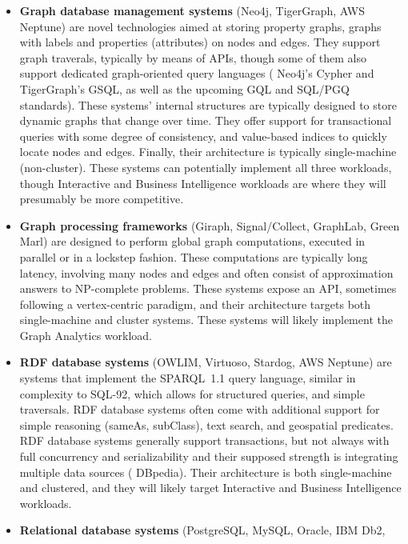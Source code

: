 \begin{itemize}
 \item \textbf{Graph database management systems} (\eg Neo4j, TigerGraph, AWS Neptune)
     are novel technologies aimed at storing property graphs,
     \ie graphs with labels and properties (attributes) on nodes and edges.
     They support graph traverals, typically by means of APIs, though
     some of them also support dedicated graph-oriented query languages (\eg
     Neo4j's Cypher and TigerGraph's GSQL, as well as the upcoming GQL and SQL/PGQ standards).
     These systems' internal structures are typically designed
     to store dynamic graphs that change over time.  They offer support for
     transactional queries with some degree of consistency, and value-based
     indices to quickly locate nodes and edges. Finally, their architecture is
     typically single-machine (non-cluster). These systems can
     potentially implement all three workloads, though Interactive and Business Intelligence
     workloads are where they will presumably be more competitive.
 \item \textbf{Graph processing frameworks} (\eg Giraph, Signal/Collect,
     GraphLab, Green Marl) are designed to perform global graph
     computations, executed in parallel or in a lockstep fashion. These computations are typically
     long latency, involving many nodes and edges and often consist of approximation
     answers to NP-complete problems. These systems expose an API, sometimes following
     a vertex-centric paradigm, and their architecture targets both single-machine and
     cluster systems. These systems will likely implement the Graph Analytics workload.
 \item \textbf{RDF database systems} (\eg OWLIM, Virtuoso, Stardog, AWS Neptune)
      are systems that implement the SPARQL~1.1 query
     language, similar in complexity to \mbox{SQL-92}, which allows for structured
     queries, and simple traversals. RDF database systems often come with
     additional support for simple reasoning (sameAs, subClass), text search, and
     geospatial predicates.  RDF database systems generally support
     transactions, but not always with full concurrency and serializability and
     their supposed strength is integrating multiple data sources (\eg
     DBpedia). Their architecture is both single-machine and clustered, and
     they will likely target Interactive and Business Intelligence workloads.
\item \textbf{Relational database systems} (\eg PostgreSQL, MySQL, Oracle, IBM Db2,

\end{itemize}
